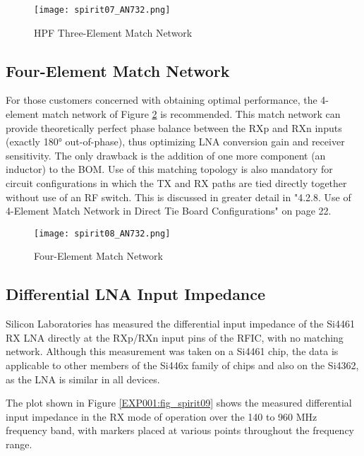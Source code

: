       \begin{figure}[ht!]  %
        \centering
        \texttt{[image: spirit07\_AN732.png]}
        \caption{HPF Three-Element Match Network \cite[s.~2]{AN643SiliconLabs}}
        \label{EXP001:fig_spirit07}
      \end{figure}
      
    \subsection{Four-Element Match Network}
      For those customers concerned with obtaining optimal performance, the 4-element match network 
      of Figure \ref{EXP001:fig_spirit08} is recommended. This match network can provide 
      theoretically perfect phase balance between the RXp and RXn inputs (exactly 180° 
      out-of-phase), thus optimizing LNA conversion gain and receiver sensitivity. The only 
      drawback is the addition of one more component (an inductor) to the BOM. Use of this matching 
      topology is also mandatory for circuit configurations in which the TX and RX paths are tied 
      directly together without use of an RF switch. This is discussed in greater detail in 
      "4.2.8. Use of 4-Element Match Network in Direct Tie Board Configurations" on page 22.
      \begin{figure}[ht!]  %
        \centering
        \texttt{[image: spirit08\_AN732.png]}
        \caption{Four-Element Match Network \cite[s.~3]{AN643SiliconLabs}}
        \label{EXP001:fig_spirit08}
      \end{figure}
    
    \subsection{Differential LNA Input Impedance} 
      Silicon Laboratories has measured the differential input impedance of the Si4461 RX LNA 
      directly at the RXp/RXn input pins of the RFIC, with no matching network. Although this 
      measurement was taken on a Si4461 chip, the data is applicable to other members of the Si446x 
      family of chips and also on the Si4362, as the LNA is similar in all devices.
      
      The plot shown in Figure \ref{EXP001:fig_spirit09} shows the measured differential input 
      impedance in the RX mode of operation over the 140 to 960 MHz frequency band, with markers 
      placed at various points throughout the frequency range.
      
